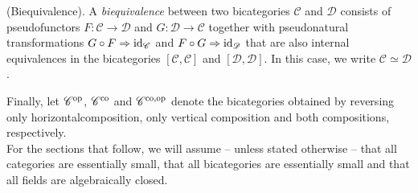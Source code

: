 \noindent\begin{definition}\textup{(Biequivalence).} A {\em biequivalence} between two bicategories $\mathscr{C}$ and $\mathscr{D}$ consists of pseudofunctors $F : \mathscr{C} \to \mathscr{D}$ and $G : \mathscr{D} \to \mathscr{C}$ together with pseudonatural transformations $G \circ F \Rightarrow \textup{id}_\mathscr{C}$ and $F \circ G \Rightarrow \textup{id}_\mathscr{D}$ that are also internal equivalences in the bicategories $[\mathscr{C}, \mathscr{C}]$ and $[\mathscr{D}, \mathscr{D}]$. In this case, we write $\mathscr{C} \simeq \mathscr{D}$.\\
\end{definition}

\noindent Finally, let $\mathscr{C}^\textup{op}$, $\mathscr{C}^\textup{co}$ and $\mathscr{C}^\textup{co,op}$ denote the bicategories obtained by reversing only horizontal\linebreak composition, only vertical composition and both compositions, respectively.\\

\noindent For the sections that follow, we will assume -- unless stated otherwise -- that all categories are essentially small, that all bicategories are essentially small and that all fields are algebraically closed.
\newpage




